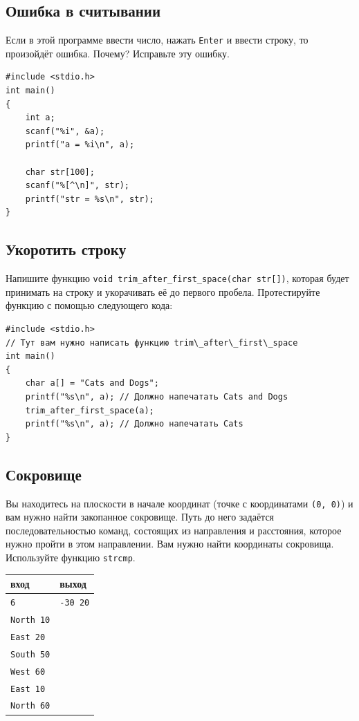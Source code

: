 \documentclass{article}
\begin{document}
\subsection{Ошибка в считывании}
Если в этой программе ввести число, нажать \texttt{Enter} и ввести строку, то произойдёт ошибка. Почему? Исправьте эту ошибку.
\begin{lstlisting}
#include <stdio.h>
int main()
{
    int a;
    scanf("%i", &a);
    printf("a = %i\n", a);

    char str[100];
    scanf("%[^\n]", str);
    printf("str = %s\n", str);
}
\end{lstlisting}



\subsection{Укоротить строку}
Напишите функцию \texttt{void trim\_after\_first\_space(char str[])}, которая будет принимать на строку и укорачивать её до первого пробела. Протестируйте функцию с помощью следующего кода:
\begin{lstlisting}
#include <stdio.h>
// Тут вам нужно написать функцию trim\_after\_first\_space
int main() 
{
    char a[] = "Cats and Dogs";
    printf("%s\n", a); // Должно напечатать Cats and Dogs
    trim_after_first_space(a);
    printf("%s\n", a); // Должно напечатать Cats
}
\end{lstlisting}


\subsection{Сокровище}
Вы находитесь на плоскости в начале координат (точке с координатами \texttt{(0, 0)}) и вам нужно найти закопанное сокровище. Путь до него задаётся последовательностью команд, состоящих из направления и расстояния, которое нужно пройти в этом направлении. Вам нужно найти координаты сокровища. Используйте функцию \texttt{strcmp}.
\begin{center} 
\begin{tabular}{ l | l }
 вход & выход \\ \hline
 \texttt{6} & \texttt{-30 20}\\
 \texttt{North 10} & \\
 \texttt{East 20} &\\
 \texttt{South 50} &\\
 \texttt{West 60} &\\
 \texttt{East 10} &\\
 \texttt{North 60} &\\
\end{tabular}
\end{center}
\end{document}
